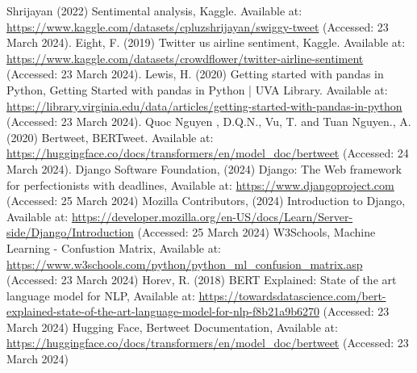 \documentclass[conference]{IEEEtran}
\begin{document}
\begin{thebibliography}{00}
 Shrijayan (2022) Sentimental analysis, Kaggle. Available at: \url{ https://www.kaggle.com/datasets/cpluzshrijayan/swiggy-tweet} (Accessed: 23 March 2024).  
 Eight, F. (2019) Twitter us airline sentiment, Kaggle. Available at: \url{https://www.kaggle.com/datasets/crowdflower/twitter-airline-sentiment} (Accessed: 23 March 2024). 
 Lewis, H. (2020) Getting started with pandas in Python, Getting Started with pandas in Python | UVA Library. Available at: \url{https://library.virginia.edu/data/articles/getting-started-with-pandas-in-python} (Accessed: 23 March 2024). 
 Quoc Nguyen , D.Q.N.,  Vu, T. and Tuan Nguyen., A. (2020) Bertweet, BERTweet. Available at: \url{https://huggingface.co/docs/transformers/en/model_doc/bertweet} (Accessed: 24 March 2024). 
 Django Software Foundation, (2024) Django: The Web framework for perfectionists with deadlines, Available at: \url{https://www.djangoproject.com} (Accessed: 25 March 2024)
 Mozilla Contributors, (2024) Introduction to Django, Available at: \url{https://developer.mozilla.org/en-US/docs/Learn/Server-side/Django/Introduction} (Accessed: 25 March 2024)
 W3Schools, Machine Learning - Confustion Matrix, Available at: \url{https://www.w3schools.com/python/python_ml_confusion_matrix.asp} (Accessed: 23 March 2024)
 Horev, R. (2018) BERT Explained: State of the art language model for NLP, Available at: \url{https://towardsdatascience.com/bert-explained-state-of-the-art-language-model-for-nlp-f8b21a9b6270} (Accessed: 23 March 2024)
 Hugging Face, Bertweet Documentation, Available at: \url{https://huggingface.co/docs/transformers/en/model_doc/bertweet} (Accessed: 23 March 2024)
\end{thebibliography}
\vspace{12pt}
\end{document}
